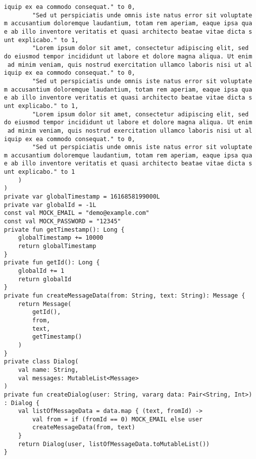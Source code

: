 \documentclass[listing]{espd}
\begin{document}
\begin{verbatim}
iquip ex ea commodo consequat." to 0,
        "Sed ut perspiciatis unde omnis iste natus error sit voluptate
m accusantium doloremque laudantium, totam rem aperiam, eaque ipsa qua
e ab illo inventore veritatis et quasi architecto beatae vitae dicta s
unt explicabo." to 1,
        "Lorem ipsum dolor sit amet, consectetur adipiscing elit, sed 
do eiusmod tempor incididunt ut labore et dolore magna aliqua. Ut enim
 ad minim veniam, quis nostrud exercitation ullamco laboris nisi ut al
iquip ex ea commodo consequat." to 0,
        "Sed ut perspiciatis unde omnis iste natus error sit voluptate
m accusantium doloremque laudantium, totam rem aperiam, eaque ipsa qua
e ab illo inventore veritatis et quasi architecto beatae vitae dicta s
unt explicabo." to 1,
        "Lorem ipsum dolor sit amet, consectetur adipiscing elit, sed 
do eiusmod tempor incididunt ut labore et dolore magna aliqua. Ut enim
 ad minim veniam, quis nostrud exercitation ullamco laboris nisi ut al
iquip ex ea commodo consequat." to 0,
        "Sed ut perspiciatis unde omnis iste natus error sit voluptate
m accusantium doloremque laudantium, totam rem aperiam, eaque ipsa qua
e ab illo inventore veritatis et quasi architecto beatae vitae dicta s
unt explicabo." to 1
    )
)
private var globalTimestamp = 1616858199000L
private var globalId = -1L
const val MOCK_EMAIL = "demo@example.com"
const val MOCK_PASSWORD = "12345"
private fun getTimestamp(): Long {
    globalTimestamp += 10000
    return globalTimestamp
}
private fun getId(): Long {
    globalId += 1
    return globalId
}
private fun createMessageData(from: String, text: String): Message {
    return Message(
        getId(),
        from,
        text,
        getTimestamp()
    )
}
private class Dialog(
    val name: String,
    val messages: MutableList<Message>
)
private fun createDialog(user: String, vararg data: Pair<String, Int>)
: Dialog {
    val listOfMessageData = data.map { (text, fromId) ->
        val from = if (fromId == 0) MOCK_EMAIL else user
        createMessageData(from, text)
    }
    return Dialog(user, listOfMessageData.toMutableList())
}
\end{verbatim}
\end{document}
